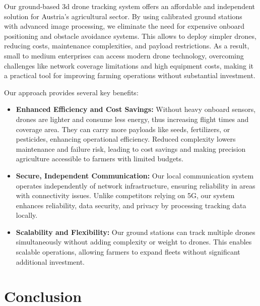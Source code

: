 Our ground-based \acrshort{3d} drone tracking system offers an affordable and independent solution for Austria's agricultural sector. By using calibrated ground stations with advanced image processing, we eliminate the need for expensive onboard positioning and obstacle avoidance systems. This allows to deploy simpler drones, reducing costs, maintenance complexities, and payload restrictions. As a result, small to medium enterprises can access modern drone technology, overcoming challenges like network coverage limitations and high equipment costs, making it a practical tool for improving farming operations without substantial investment.

Our approach provides several key benefits:

\begin{itemize} 
	\item \textbf{Enhanced Efficiency and Cost Savings:} Without heavy onboard sensors, drones are lighter and consume less energy, thus increasing flight times and coverage area. They can carry more payloads like seeds, fertilizers, or pesticides, enhancing operational efficiency. Reduced complexity lowers maintenance and failure risk, leading to cost savings and making precision agriculture accessible to farmers with limited budgets.
	
	\item \textbf{Secure, Independent Communication:} Our local communication system operates independently of network infrastructure, ensuring reliability in areas with connectivity issues. Unlike competitors relying on 5G, our system enhances reliability, data security, and privacy by processing tracking data locally.
	
	\item \textbf{Scalability and Flexibility:} Our ground stations can track multiple drones simultaneously without adding complexity or weight to drones. This enables scalable operations, allowing farmers to expand fleets without significant additional investment.

\end{itemize}

\section{Conclusion}

